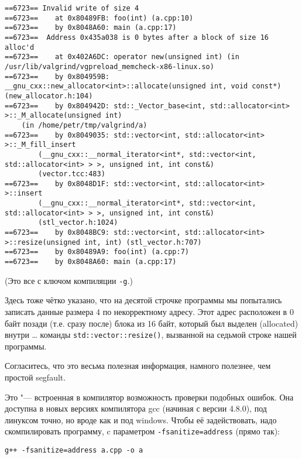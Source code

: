 {\footnotesize
\begin{verbatim}
==6723== Invalid write of size 4
==6723==    at 0x80489FB: foo(int) (a.cpp:10)
==6723==    by 0x8048A60: main (a.cpp:17)
==6723==  Address 0x435a038 is 0 bytes after a block of size 16 alloc'd
==6723==    at 0x402A6DC: operator new(unsigned int) (in /usr/lib/valgrind/vgpreload_memcheck-x86-linux.so)
==6723==    by 0x804959B: __gnu_cxx::new_allocator<int>::allocate(unsigned int, void const*) (new_allocator.h:104)
==6723==    by 0x804942D: std::_Vector_base<int, std::allocator<int> >::_M_allocate(unsigned int) 
    (in /home/petr/tmp/valgrind/a)
==6723==    by 0x8049035: std::vector<int, std::allocator<int> >::_M_fill_insert
        (__gnu_cxx::__normal_iterator<int*, std::vector<int, std::allocator<int> > >, unsigned int, int const&) 
        (vector.tcc:483)
==6723==    by 0x8048D1F: std::vector<int, std::allocator<int> >::insert
        (__gnu_cxx::__normal_iterator<int*, std::vector<int, std::allocator<int> > >, unsigned int, int const&) 
        (stl_vector.h:1024)
==6723==    by 0x8048BC9: std::vector<int, std::allocator<int> >::resize(unsigned int, int) (stl_vector.h:707)
==6723==    by 0x80489A9: foo(int) (a.cpp:7)
==6723==    by 0x8048A60: main (a.cpp:17)
\end{verbatim}
\par
}
(Это все с ключом компиляции \verb`-g`.)

Здесь тоже чётко указано, что на десятой строчке программы мы попытались записать данные размера 4 по некорректному адресу. 
Этот адрес расположен в 0 байт позади (т.е. сразу после) блока из 16 байт, который был выделен (allocated) внутри \dots{} команды \verb`std::vector::resize()`,
вызванной на седьмой строке нашей программы.

Согласитесь, что это весьма полезная информация, намного полезнее, чем простой segfault.

Это "--- встроенная в компилятор возможность проверки подобных ошибок.
Она доступна в новых версиях компилятора gcc (начиная с версии 4.8.0), под линуксом точно, но вроде как и под windows.
Чтобы её задействовать, надо скомпилировать программу, c параметром \verb`-fsanitize=address` (прямо так):
\begin{verbatim}
g++ -fsanitize=address a.cpp -o a
\end{verbatim}

